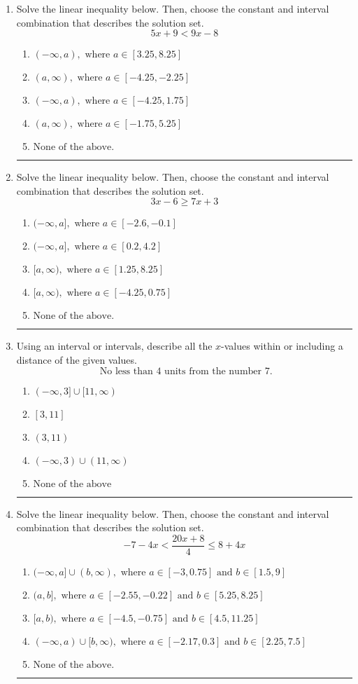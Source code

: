 \documentclass[14pt]{extbook}
\newcommand{\litem}[1]{\item#1\hspace*{-1cm}\rule{\textwidth}{0.4pt}}
\begin{document}
\begin{enumerate}
{\begin{enumerate}[label=\Alph*.]
\end{enumerate} }
\litem{
Solve the linear inequality below. Then, choose the constant and interval combination that describes the solution set.\[ 5x + 9 < 9x -8 \]\begin{enumerate}[label=\Alph*.]
\item \( (-\infty, a), \text{ where } a \in [3.25, 8.25] \)
\item \( (a, \infty), \text{ where } a \in [-4.25, -2.25] \)
\item \( (-\infty, a), \text{ where } a \in [-4.25, 1.75] \)
\item \( (a, \infty), \text{ where } a \in [-1.75, 5.25] \)
\item \( \text{None of the above}. \)

\end{enumerate} }
\litem{
Solve the linear inequality below. Then, choose the constant and interval combination that describes the solution set.\[ 3x -6 \geq 7x + 3 \]\begin{enumerate}[label=\Alph*.]
\item \( (-\infty, a], \text{ where } a \in [-2.6, -0.1] \)
\item \( (-\infty, a], \text{ where } a \in [0.2, 4.2] \)
\item \( [a, \infty), \text{ where } a \in [1.25, 8.25] \)
\item \( [a, \infty), \text{ where } a \in [-4.25, 0.75] \)
\item \( \text{None of the above}. \)

\end{enumerate} }
\litem{
Using an interval or intervals, describe all the $x$-values within or including a distance of the given values.\[ \text{ No less than } 4 \text{ units from the number } 7. \]\begin{enumerate}[label=\Alph*.]
\item \( (-\infty, 3] \cup [11, \infty) \)
\item \( [3, 11] \)
\item \( (3, 11) \)
\item \( (-\infty, 3) \cup (11, \infty) \)
\item \( \text{None of the above} \)

\end{enumerate} }
\litem{
Solve the linear inequality below. Then, choose the constant and interval combination that describes the solution set.\[ -7 - 4 x < \frac{20 x + 8}{4} \leq 8 + 4 x \]\begin{enumerate}[label=\Alph*.]
\item \( (-\infty, a] \cup (b, \infty), \text{ where } a \in [-3, 0.75] \text{ and } b \in [1.5, 9] \)
\item \( (a, b], \text{ where } a \in [-2.55, -0.22] \text{ and } b \in [5.25, 8.25] \)
\item \( [a, b), \text{ where } a \in [-4.5, -0.75] \text{ and } b \in [4.5, 11.25] \)
\item \( (-\infty, a) \cup [b, \infty), \text{ where } a \in [-2.17, 0.3] \text{ and } b \in [2.25, 7.5] \)
\item \( \text{None of the above.} \)


\end{enumerate}}
\end{enumerate}
\end{document}
